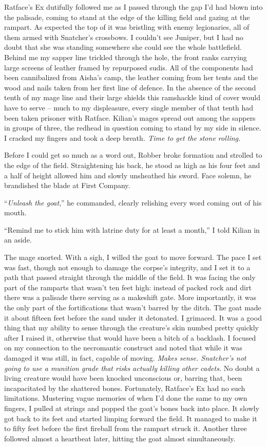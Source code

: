 \documentclass[12pt, openany]{book}
\begin{document}
Ratface’s Ex dutifully followed me as I passed through the gap I’d had blown into the palisade, coming to stand at the edge of the killing field and gazing at the rampart. As expected the top of it was bristling with enemy legionaries, all of them armed with Snatcher’s crossbows. I couldn’t see Juniper, but I had no doubt that she was standing somewhere she could see the whole battlefield. Behind me my sapper line trickled through the hole, the front ranks carrying large screens of leather framed by repurposed sudis. All of the components had been cannibalized from Aisha’s camp, the leather coming from her tents and the wood and nails taken from her first line of defence. In the absence of the second tenth of my mage line and their large shields this ramshackle kind of cover would have to serve – much to my displeasure, every single member of that tenth had been taken prisoner with Ratface. Kilian’s mages spread out among the sappers in groups of three, the redhead in question coming to stand by my side in silence. I cracked my fingers and took a deep breath\textit{. Time to get the stone rolling.}

Before I could get so much as a word out, Robber broke formation and strolled to the edge of the field. Straightening his back, he stood as high as his four feet and a half of height allowed him and slowly unsheathed his sword. Face solemn, he brandished the blade at First Company.

“\textit{Unleash the goat},” he commanded, clearly relishing every word coming out of his mouth.

“Remind me to stick him with latrine duty for at least a month,” I told Kilian in an aside.

The mage snorted. With a sigh, I willed the goat to move forward. The pace I set was fast, though not enough to damage the corpse’s integrity, and I set it to a path that passed straight through the middle of the field. It was facing the only part of the ramparts that wasn’t ten feet high: instead of packed rock and dirt there was a palisade there serving as a makeshift gate. More importantly, it was the only part of the fortifications that wasn’t barred by the ditch. The goat made it about fifteen feet before the sand under it detonated. I grimaced. It was a good thing that my ability to sense through the creature’s skin numbed pretty quickly after I raised it, otherwise that would have been a bitch of a backlash. I focused on my connection to the necromantic construct and noted that while it was damaged it was still, in fact, capable of moving. \textit{Makes sense. Snatcher’s not going to use a munition grade that risks actually killing other cadets.} No doubt a living creature would have been knocked unconscious or, barring that, been incapacitated by the shattered bones. Fortunately, Ratface’s Ex had no such limitations. Mustering vague memories of when I’d done the same to my own fingers, I pulled at strings and popped the goat’s bones back into place. It slowly got back to its feet and started limping forward the field. It managed to make it to fifty feet before the first fireball from the rampart struck it. Another three followed almost a heartbeat later, hitting the goat almost simultaneously.
\end{document}

